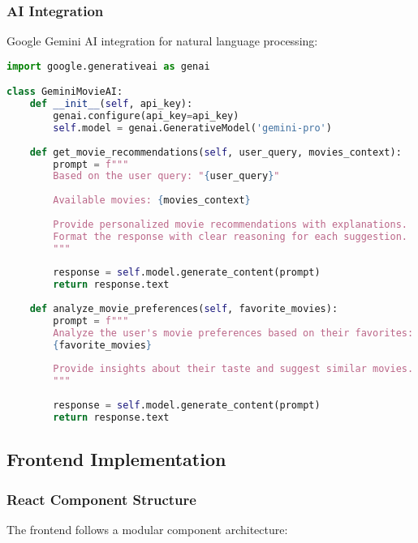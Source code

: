 \documentclass[12pt,a4paper]{article}
\begin{document}
\subsubsection{AI Integration}
Google Gemini AI integration for natural language processing:

\begin{lstlisting}[language=Python, caption=Gemini AI Integration]
import google.generativeai as genai

class GeminiMovieAI:
    def __init__(self, api_key):
        genai.configure(api_key=api_key)
        self.model = genai.GenerativeModel('gemini-pro')
        
    def get_movie_recommendations(self, user_query, movies_context):
        prompt = f"""
        Based on the user query: "{user_query}"
        
        Available movies: {movies_context}
        
        Provide personalized movie recommendations with explanations.
        Format the response with clear reasoning for each suggestion.
        """
        
        response = self.model.generate_content(prompt)
        return response.text
        
    def analyze_movie_preferences(self, favorite_movies):
        prompt = f"""
        Analyze the user's movie preferences based on their favorites:
        {favorite_movies}
        
        Provide insights about their taste and suggest similar movies.
        """
        
        response = self.model.generate_content(prompt)
        return response.text
\end{lstlisting}

\subsection{Frontend Implementation}

\subsubsection{React Component Structure}
The frontend follows a modular component architecture:
\end{document}

